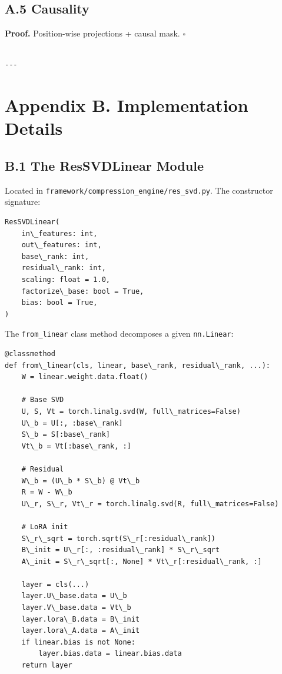 \subsection{A.5 Causality}

\textbf{Proof.} Position-wise projections + causal mask. $\square$
\begin{lstlisting}

---
\end{lstlisting}

\section{Appendix B. Implementation Details}

\subsection{B.1 The ResSVDLinear Module}

Located in \texttt{framework/compression\_engine/res\_svd.py}. The constructor 
signature:

\begin{lstlisting}
ResSVDLinear(
    in\_features: int,
    out\_features: int,
    base\_rank: int,
    residual\_rank: int,
    scaling: float = 1.0,
    factorize\_base: bool = True,
    bias: bool = True,
)
\end{lstlisting}

The \texttt{from\_linear} class method decomposes a given \texttt{nn.Linear}:

\begin{lstlisting}
@classmethod
def from\_linear(cls, linear, base\_rank, residual\_rank, ...):
    W = linear.weight.data.float()
    
    # Base SVD
    U, S, Vt = torch.linalg.svd(W, full\_matrices=False)
    U\_b = U[:, :base\_rank]
    S\_b = S[:base\_rank]
    Vt\_b = Vt[:base\_rank, :]
    
    # Residual
    W\_b = (U\_b * S\_b) @ Vt\_b
    R = W - W\_b
    U\_r, S\_r, Vt\_r = torch.linalg.svd(R, full\_matrices=False)
    
    # LoRA init
    S\_r\_sqrt = torch.sqrt(S\_r[:residual\_rank])
    B\_init = U\_r[:, :residual\_rank] * S\_r\_sqrt
    A\_init = S\_r\_sqrt[:, None] * Vt\_r[:residual\_rank, :]
    
    layer = cls(...)
    layer.U\_base.data = U\_b
    layer.V\_base.data = Vt\_b
    layer.lora\_B.data = B\_init
    layer.lora\_A.data = A\_init
    if linear.bias is not None:
        layer.bias.data = linear.bias.data
    return layer
\end{lstlisting}

